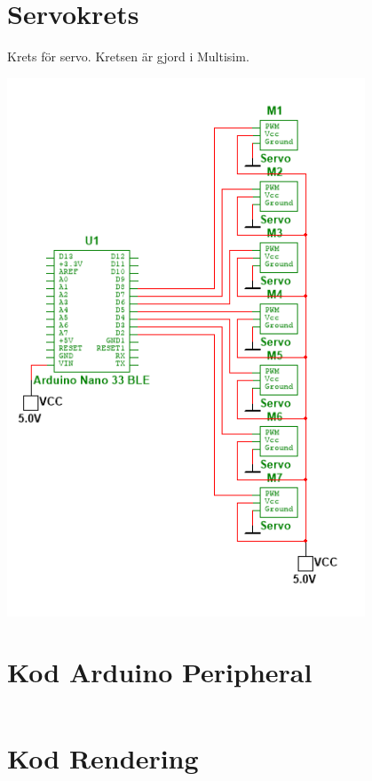 \documentclass[a4paper]{article}
\begin{document}
\begin{sloppypar}
    \section{Servokrets}
    \label{bilaga:Kretsschema-servo}
    \begin{FlushLeft}
        Krets för servo. Kretsen är gjord i Multisim.
    \end{FlushLeft}
    \includegraphics[width = 0.8\textwidth]{servo.png}

    \newpage
    \section{Kod Arduino Peripheral}
    \label{bilaga:Kod_Arduino_Peripheral}
    \inputminted[breaklines]{cpp}{./Code/peripheral.cpp}

    \newpage
    \section{Kod Rendering}
    \label{bilaga:Kod_Rendering}
    \inputminted[breaklines]{csharp}{./Code/handController.cs}
    \newpage
\end{sloppypar}
\end{document}
